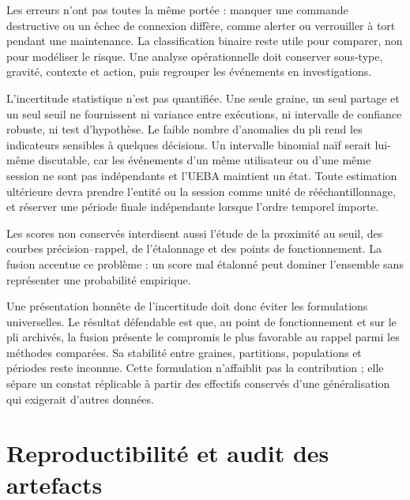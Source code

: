 \documentclass[11pt,a4paper,oneside]{report}
\theoremstyle{definition}
\theoremstyle{plain}
\begin{document}
Les erreurs n'ont pas toutes la même portée : manquer une commande destructive
ou un échec de connexion diffère, comme alerter ou verrouiller à tort pendant
une maintenance. La classification binaire reste utile pour comparer, non pour
modéliser le risque. Une analyse opérationnelle doit conserver sous-type,
gravité, contexte et action, puis regrouper les événements en investigations.

L'incertitude statistique n'est pas quantifiée. Une seule graine, un seul
partage et un seul seuil ne fournissent ni variance entre exécutions, ni
intervalle de confiance robuste, ni test d'hypothèse. Le faible nombre
d'anomalies du pli rend les indicateurs sensibles à quelques décisions. Un
intervalle binomial naïf serait lui-même discutable, car les événements d'un
même utilisateur ou d'une même session ne sont pas indépendants et l'UEBA
maintient un état. Toute estimation ultérieure devra prendre l'entité ou la
session comme unité de rééchantillonnage, et réserver une période finale
indépendante lorsque l'ordre temporel importe.

Les scores non conservés interdisent aussi l'étude de la proximité au seuil,
des courbes précision--rappel, de l'étalonnage et des points de fonctionnement.
La fusion accentue ce problème : un score mal étalonné peut dominer l'ensemble
sans représenter une probabilité empirique.

Une présentation honnête de l'incertitude doit donc éviter les formulations
universelles. Le résultat défendable est que, au point de fonctionnement et
sur le pli archivés, la fusion présente le compromis le plus favorable au
rappel parmi les méthodes comparées. Sa stabilité entre graines, partitions,
populations et périodes reste inconnue. Cette formulation n'affaiblit pas la
contribution ; elle sépare un constat réplicable à partir des effectifs
conservés d'une généralisation qui exigerait d'autres données.

\section{Reproductibilité et audit des artefacts}
\label{sec:validation-reproducibility}
\end{document}
